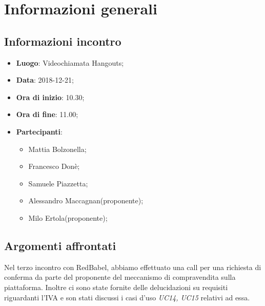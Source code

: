 \section{Informazioni generali}

\subsection{Informazioni incontro}
\begin{itemize}
\item \textbf{Luogo}: Videochiamata Hangouts;
\item \textbf{Data}: 2018-12-21;
\item \textbf{Ora di inizio}: 10.30;
\item \textbf{Ora di fine}: 11.00;
\item \textbf{Partecipanti}:
\begin{itemize}
	\item Mattia Bolzonella;
	\item Francesco Donè;
	\item Samuele Piazzetta;
	\item Alessandro Maccagnan(proponente);
	\item Milo Ertola(proponente);
\end{itemize}
\end{itemize}

\subsection{Argomenti affrontati}
Nel terzo incontro con RedBabel, abbiamo effettuato una call per una richiesta di conferma da parte del proponente del meccanismo di compravendita sulla piattaforma.
Inoltre ci sono state fornite delle delucidazioni su requisiti riguardanti l’IVA e son stati discussi i casi d’uso \textit{UC14, UC15} relativi ad essa.

